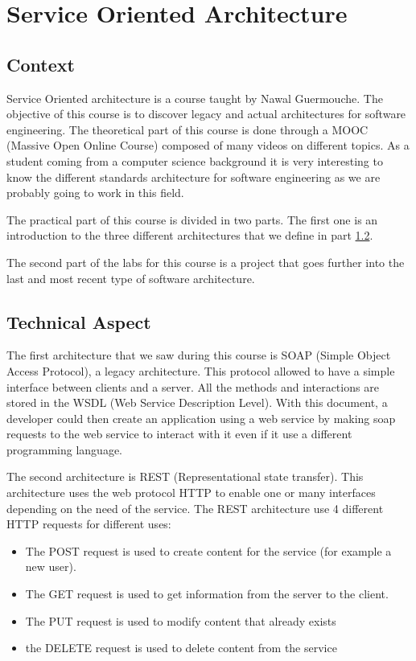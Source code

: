 \section{Service Oriented Architecture}

\subsection{Context}

Service Oriented architecture is a course taught by Nawal Guermouche. The objective of this course is to discover legacy and actual architectures for software engineering. The theoretical part of this course is done through a MOOC (Massive Open Online Course) composed of many videos on different topics. As a student coming from a computer science background it is very interesting to know the different standards architecture for software engineering as we are probably going to work in this field.
\smallskip

The practical part of this course is divided in two parts. The first one is an introduction to the three different architectures that we define in part \ref{technical aspects}.
\smallskip

The second part of the labs for this course is a project that goes further into the last and most recent type of software architecture.

\subsection{Technical Aspect} \label{technical aspects}

The first architecture that we saw during this course is SOAP (Simple Object Access Protocol), a legacy architecture. This protocol allowed to have a simple interface between clients and a server. All the methods and interactions are stored in the WSDL (Web Service Description Level). With this document, a developer could then create an application using a web service by making soap requests to the web service to interact with it even if it use a different programming language.
\smallskip

The second architecture is REST (Representational state transfer). This architecture uses the web protocol HTTP to enable one or many interfaces depending on the need of the service. The REST architecture use 4 different HTTP requests for different uses: 

\begin{itemize}
    \item The POST request is used to create content for the service (for example a new user).
    \item The GET request is used to get information from the server to the client.
    \item The PUT request is used to modify content that already exists
    \item the DELETE request is used to delete content from the service
\end{itemize}

